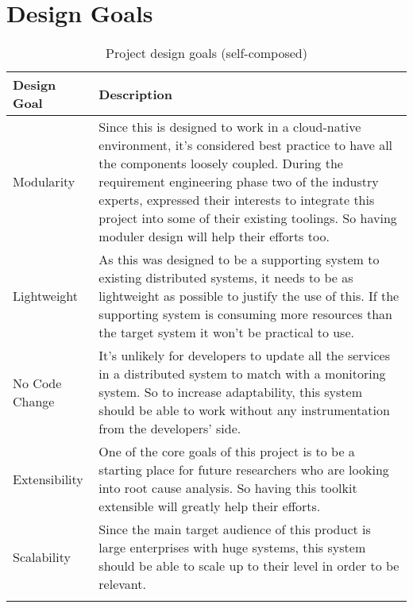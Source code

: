 \section{Design Goals}
\begin{longtable}{|p{22mm}|p{131mm}|}
\hline
\textbf{Design Goal} &
    \textbf{Description} \\ \hline
    Modularity &
    Since this is designed to work in a cloud-native environment, it’s considered best practice to have all the components loosely coupled. During the requirement engineering phase two of the industry experts, expressed their interests to integrate this project into some of their existing toolings. So having moduler design will help their efforts too. \\ \hline
    
    Lightweight &
    As this was designed to be a supporting system to existing distributed systems, it needs to be as lightweight as possible to justify the use of this. If the supporting system is consuming more resources than the target system it won’t be practical to use. \\ \hline
    
    No Code Change &
    It’s unlikely for developers to update all the services in a distributed system to match with a monitoring system. So to increase adaptability, this system should be able to work without any instrumentation from the developers’ side. \\ \hline
    
    Extensibility &
    One of the core goals of this project is to be a starting place for future researchers who are looking into root cause analysis. So having this toolkit extensible will greatly help their efforts. \\ \hline
    
    Scalability &
    Since the main target audience of this product is large enterprises with huge systems, this system should be able to scale up to their level in order to be relevant. \\ \hline

    \caption{Project design goals (self-composed)}
\end{longtable}